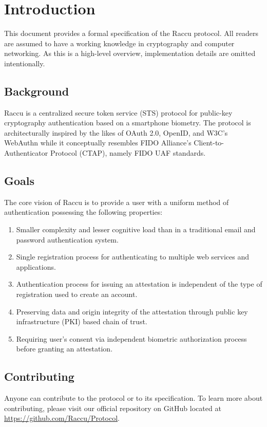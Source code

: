 \section{Introduction}
This document provides a formal specification of the Raccu protocol. All readers are assumed to have a working 
knowledge in cryptography and computer networking. As this is a high-level overview, implementation details are 
omitted intentionally.

    \subsection{Background}
    Raccu is a centralized secure token service (STS) protocol for public-key cryptography authentication 
    based on a smartphone biometry. The protocol is architecturally inspired by the likes of OAuth 2.0, OpenID, 
    and W3C's WebAuthn while it conceptually resembles FIDO Alliance's Client-to-Authenticator Protocol (CTAP), 
    namely FIDO UAF standards.

    \subsection{Goals}
    The core vision of Raccu is to provide a user with a uniform method of authentication possessing the 
    following properties: 
        \begin{enumerate}
            \item Smaller complexity and lesser cognitive load than in a traditional email and password 
                  authentication system.
            \item Single registration process for authenticating to multiple web services and applications.
            \item Authentication process for issuing an attestation is independent of the type of registration 
                  used to create an account.
            \item Preserving data and origin integrity of the attestation through public key infrastructure (PKI) 
                  based chain of trust.
            \item Requiring user's consent via independent biometric authorization process before granting an 
                  attestation.
        \end{enumerate}

     \subsection{Contributing}
     Anyone can contribute to the protocol or to its specification. To learn more about contributing, please visit our 
     official repository on GitHub located at \href{https://github.com/Raccu/Protocol}{https://github.com/Raccu/Protocol}.

